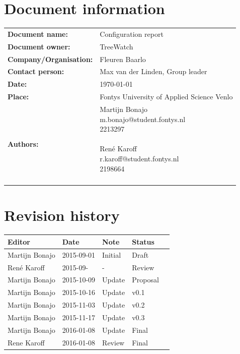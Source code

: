 \documentclass[12pt]{article}
\begin{document}
	 \section*{Document information}
	\begin{tabular}{ll}
		\textbf{Document name:} & Configuration report\\
		\textbf{Document owner:} & TreeWatch \\
		\textbf{Company/Organisation:} & Fleuren Baarlo \\
		\textbf{Contact person:} & Max van der Linden, Group leader \\
		\textbf{Date:} & \today \\
		\textbf{Place:} & Fontys University of Applied Science Venlo \\
		\textbf{Authors:} & \parbox[t]{5cm}{
		Martijn Bonajo\\ m.bonajo@student.fontys.nl\\ 2213297 \\ \\
		René Karoff\\ r.karoff@student.fontys.nl\\ 2198664 \\ \\ }
	\end{tabular}


	\section*{Revision history}

	\begin{table}[htbp]
		\begin{tabular}{ p{}  p{3cm}  p{1,5cm}  p{}  p{} }
			\textbf{Editor} & \textbf{Date} & \textbf{Note} & \textbf{Status} \\ \hline
			Martijn Bonajo & 2015-09-01 & Initial & Draft \\
			René Karoff & 2015-09- & - & Review \\
			Martijn Bonajo & 2015-10-09 & Update & Proposal \\
			Martijn Bonajo & 2015-10-16 & Update & v0.1 \\
			Martijn Bonajo & 2015-11-03 & Update & v0.2 \\
			Martijn Bonajo & 2015-11-17 & Update & v0.3 \\
			Martijn Bonajo & 2016-01-08 & Update & Final\\
			Rene Karoff & 2016-01-08 & Review & Final \\
		\end{tabular}
	\end{table}
	
\end{document}
